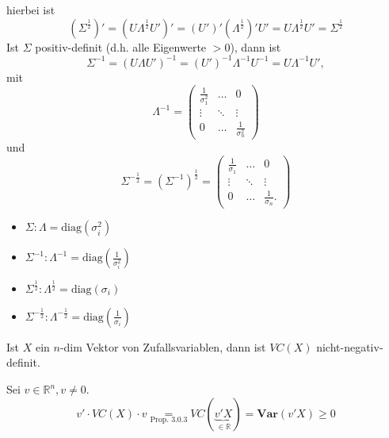 \documentclass[10pt]{article}
\newcommand{\IR}{\mathbb{R}} %
\newcommand{\Var}{\textbf{Var}} %
\newcommand{\halb}{\frac{1}{2}} %
\newenvironment{BWS}[1][]
{\begin{Beweis}[frametitle=#1]}{\end{Beweis}}
\begin{document}
			hierbei ist
			\begin{equation*}
				\left(\Sigma^{\halb}\right)' = (U \Lambda^{\frac{1}{2}} U')' = (U')' (\Lambda^{\halb})' U' = U \Lambda^{\frac{1}{2}} U' = \Sigma^{\halb}
			\end{equation*}
			Ist $\Sigma$ positiv-definit (d.h. alle Eigenwerte $>0$), dann ist \begin{equation*}
				\Sigma^{-1} = (U \Lambda U')^{-1} = (U')^{-1} \Lambda ^{-1} U^{-1} = U \Lambda^{-1} U',
			\end{equation*}
			mit \begin{equation*}
				\Lambda^{-1} = \begin{pmatrix}
					\frac{1}{\sigma_1^2} & \ldots & 0\\
					\vdots & \ddots & \vdots \\
					0 & \ldots & \frac{1}{\sigma^2_n}
				\end{pmatrix}
			\end{equation*}
			und \begin{equation*}
				\Sigma^{-\halb} = (\Sigma^{-1})^{\halb} = \begin{pmatrix}
					\frac{1}{\sigma_1} & \ldots & 0\\
					\vdots & \ddots & \vdots \\
					0 & \ldots & \frac{1}{\sigma_n}.
				\end{pmatrix}
			\end{equation*}
			\begin{Bemerkung}
				\begin{itemize}
					\item $\Sigma: \Lambda = \text{diag}(\sigma^2_i)$
					\item  $\Sigma^{-1}: \Lambda^{-1} = \text{diag}(\frac{1}{\sigma^2_i})$
					\item  $\Sigma^{\halb}: \Lambda^{\halb} = \text{diag}(\sigma_i)$
					\item  $\Sigma^{-\halb}: \Lambda^{-\halb} = \text{diag}(\frac{1}{\sigma_i})$
				\end{itemize}
			\end{Bemerkung}
			\begin{Korollar}
				Ist $X$ ein $n$-dim Vektor von Zufallsvariablen, dann ist $VC(X)$ nicht-negativ-definit. 
			\end{Korollar}
			\begin{BWS}[Beweis 3.1.1 (Nicht-Negativ-Definitheit VC-Matrix)]
				Sei $v \in \IR^n, v \neq 0.$
				\begin{equation*}
					v' \cdot VC(X) \cdot v \underset{\text{Prop. 3.0.3}}{=} VC(\underbrace{v' X}_{\in \IR}) = \Var(v' X) \geq 0
				\end{equation*}
			\end{BWS}
\end{document}
